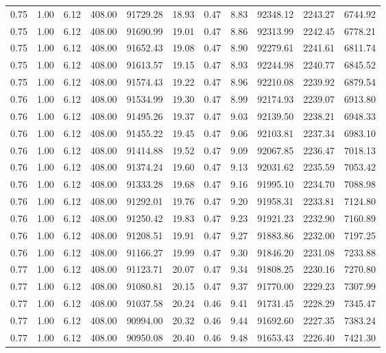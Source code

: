 \begin{table}[!ht]
\begin{tabular}{rrrrrrrrrrr}
0.75 & 1.00 & 6.12 & 408.00 & 91729.28 & 18.93 & 0.47 & 8.83 & 92348.12 & 2243.27 & 6744.92 \\
0.75 & 1.00 & 6.12 & 408.00 & 91690.99 & 19.01 & 0.47 & 8.86 & 92313.99 & 2242.45 & 6778.21 \\
0.75 & 1.00 & 6.12 & 408.00 & 91652.43 & 19.08 & 0.47 & 8.90 & 92279.61 & 2241.61 & 6811.74 \\
0.75 & 1.00 & 6.12 & 408.00 & 91613.57 & 19.15 & 0.47 & 8.93 & 92244.98 & 2240.77 & 6845.52 \\
0.75 & 1.00 & 6.12 & 408.00 & 91574.43 & 19.22 & 0.47 & 8.96 & 92210.08 & 2239.92 & 6879.54 \\
0.76 & 1.00 & 6.12 & 408.00 & 91534.99 & 19.30 & 0.47 & 8.99 & 92174.93 & 2239.07 & 6913.80 \\
0.76 & 1.00 & 6.12 & 408.00 & 91495.26 & 19.37 & 0.47 & 9.03 & 92139.50 & 2238.21 & 6948.33 \\
0.76 & 1.00 & 6.12 & 408.00 & 91455.22 & 19.45 & 0.47 & 9.06 & 92103.81 & 2237.34 & 6983.10 \\
0.76 & 1.00 & 6.12 & 408.00 & 91414.88 & 19.52 & 0.47 & 9.09 & 92067.85 & 2236.47 & 7018.13 \\
0.76 & 1.00 & 6.12 & 408.00 & 91374.24 & 19.60 & 0.47 & 9.13 & 92031.62 & 2235.59 & 7053.42 \\
0.76 & 1.00 & 6.12 & 408.00 & 91333.28 & 19.68 & 0.47 & 9.16 & 91995.10 & 2234.70 & 7088.98 \\
0.76 & 1.00 & 6.12 & 408.00 & 91292.01 & 19.76 & 0.47 & 9.20 & 91958.31 & 2233.81 & 7124.80 \\
0.76 & 1.00 & 6.12 & 408.00 & 91250.42 & 19.83 & 0.47 & 9.23 & 91921.23 & 2232.90 & 7160.89 \\
0.76 & 1.00 & 6.12 & 408.00 & 91208.51 & 19.91 & 0.47 & 9.27 & 91883.86 & 2232.00 & 7197.25 \\
0.76 & 1.00 & 6.12 & 408.00 & 91166.27 & 19.99 & 0.47 & 9.30 & 91846.20 & 2231.08 & 7233.88 \\
0.77 & 1.00 & 6.12 & 408.00 & 91123.71 & 20.07 & 0.47 & 9.34 & 91808.25 & 2230.16 & 7270.80 \\
0.77 & 1.00 & 6.12 & 408.00 & 91080.81 & 20.15 & 0.47 & 9.37 & 91770.00 & 2229.23 & 7307.99 \\
0.77 & 1.00 & 6.12 & 408.00 & 91037.58 & 20.24 & 0.46 & 9.41 & 91731.45 & 2228.29 & 7345.47 \\
0.77 & 1.00 & 6.12 & 408.00 & 90994.00 & 20.32 & 0.46 & 9.44 & 91692.60 & 2227.35 & 7383.24 \\
0.77 & 1.00 & 6.12 & 408.00 & 90950.08 & 20.40 & 0.46 & 9.48 & 91653.43 & 2226.40 & 7421.30 \\

\end{tabular}
\end{table}

